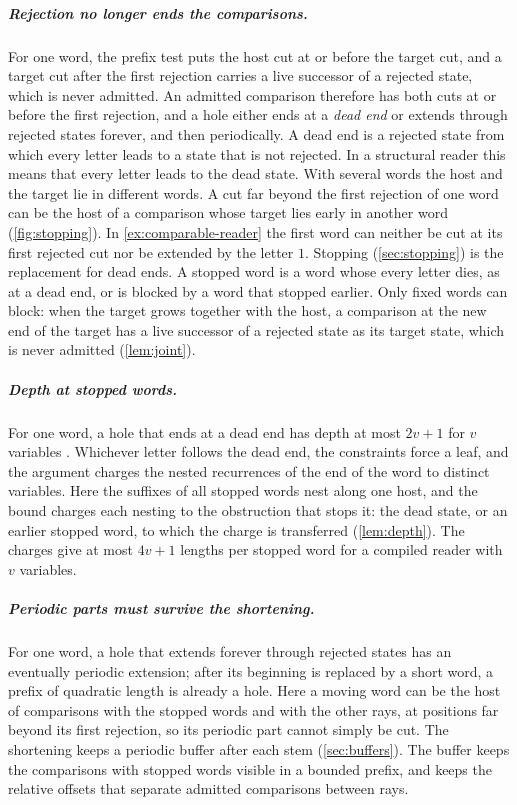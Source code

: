 \subparagraph*{Rejection no longer ends the comparisons.}
For one word, the prefix test puts the host cut at or before the target cut, and a target
cut after the first rejection carries a live successor of a rejected state, which is never
admitted. An admitted comparison therefore has both cuts at or before the first rejection,
and a hole either ends at a \emph{dead end} or extends through rejected states forever, and
then periodically. A dead end is a rejected state from which every letter leads to a state
that is not rejected. In a structural reader this means that every letter leads to the
dead state. With several words the host and the target lie in different words. A cut far
beyond the first rejection of one word can be the host of a comparison whose target lies
early in another word (\cref{fig:stopping}). In \cref{ex:comparable-reader} the first word
can neither be cut at its first rejected cut nor be extended by the letter $1$. Stopping
(\cref{sec:stopping}) is the replacement for dead ends. A stopped word is a word whose
every letter dies, as at a dead end, or is blocked by a word that stopped earlier. Only
fixed words can block: when the target grows together with the host, a comparison at the
new end of the target has a live successor of a rejected state as its target state, which
is never admitted (\cref{lem:joint}).

\subparagraph*{Depth at stopped words.}
For one word, a hole that ends at a dead end has depth at most $2v+1$ for $v$ variables
\cite{NSSE26}. Whichever letter follows the dead end, the constraints force a leaf, and the
argument charges the nested recurrences of the end of the word to distinct variables. Here
the
suffixes of all stopped words nest along one host, and the bound charges each nesting to
the obstruction that stops it: the dead state, or an earlier stopped word, to which the
charge is transferred (\cref{lem:depth}). The charges give at most $4v+1$ lengths per
stopped word for a compiled reader with $v$ variables.

\subparagraph*{Periodic parts must survive the shortening.}
For one word, a hole that extends forever through rejected states has an eventually
periodic extension; after its beginning is replaced by a short word, a prefix of quadratic
length is already a hole. Here a moving word can be
the host of comparisons with the stopped words and with the other rays, at positions far
beyond its first rejection, so its periodic part cannot simply be cut. The shortening keeps
a periodic buffer after each stem (\cref{sec:buffers}). The buffer keeps the comparisons
with stopped words visible in a bounded prefix, and keeps the relative offsets that
separate admitted comparisons between rays.

